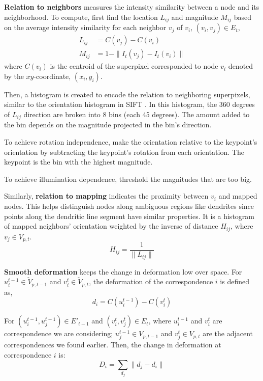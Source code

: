 \documentclass{article}
\begin{document}
\textbf{Relation to neighbors} measures the intensity similarity between a node and its neighborhood. To compute, first find the location $L_{ij}$ and magnitude $M_{ij}$ based on the average intensity similarity for each neighbor $v_j$ of $v_i$, $(v_i, v_j) \in E_t$,
\begin{equation}
\begin{aligned}
L_{ij} & = C(v_j) - C(v_i) \\
M_{ij} & = 1 - \| I_t(v_j) - I_t(v_i) \|
\end{aligned}
\end{equation}
where $C(v_i)$ is the centroid of the superpixel corresponded to node $v_i$ denoted by the $xy$-coordinate, $(x_i, y_i)$.

Then, a histogram is created to encode the relation to neighboring superpixels, similar to the orientation histogram in SIFT \cite{lowe1999}. In this histogram, the 360 degrees of $L_{ij}$ direction are broken into 8 bins (each 45 degrees). The amount added to the bin depends on the magnitude projected in the bin's direction.

To achieve rotation independence, make the orientation relative to the keypoint's orientation by subtracting the keypoint's rotation from each orientation. The keypoint is the bin with the highest magnitude.

To achieve illumination dependence, threshold the magnitudes that are too big.

Similarly, \textbf{relation to mapping} indicates the proximity between $v_i$ and mapped nodes. This helps distinguish nodes along ambiguous regions like dendrites since points along the dendritic line segment have similar properties. It is a histogram of mapped neighbors' orientation weighted by the inverse of distance $H_{ij}$, where $v_j \in V_{p,t}$.
\begin{equation}
H_{ij} = \frac{1}{ \| L_{ij} \| }
\end{equation}

\textbf{Smooth deformation} keeps the change in deformation low over space. For $u_i^{t-1} \in \check{V}_{p,t-1}$ and $v_i^t \in \check{V}_{p,t}$, the deformation of the correspondence $i$ is defined as,
\begin{equation}
d_i = C(u_i^{t-1}) - C(v_i^t)
\end{equation}

For $(u_i^{t-1}, u_j^{t-1}) \in E'_{t-1}$ and $(v_i^t, v_j^t) \in E_t$, where $u_i^{t-1}$ and $v_i^t$ are correspondence we are considering; $u_j^{t-1} \in V_{p,t-1}$ and $v_j^t \in  V_{p,t}$ are the adjacent correspondences we found earlier. Then, the change in deformation at correspondence $i$ is:
\begin{equation}
D_i = \sum_{d_j} \| d_j - d_i \|
\end{equation}
\end{document}
